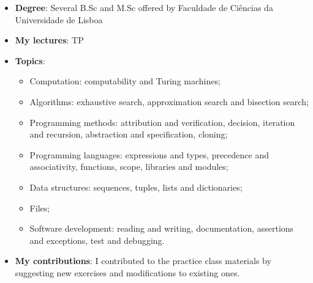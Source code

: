 \begin{itemize}
    \item \textbf{Degree}: Several B.Sc and M.Sc offered by Faculdade de Ciências da Universidade de Lisboa
    \item \textbf{My lectures}: TP
    \item \textbf{Topics}:
    \begin{itemize}
        \item Computation: computability and Turing machines;
        \item Algorithms: exhaustive search, approximation search and bisection search;
        \item Programming methods: attribution and verification, decision, iteration and recursion, abstraction and specification, cloning;
        \item Programming languages: expressions and types, precedence and associativity, functions, scope, libraries and modules;
        \item Data structures: sequences, tuples, lists and dictionaries;
        \item Files;
        \item Software development: reading and writing, documentation, assertions and exceptions, test and debugging.
    \end{itemize}
    \item \textbf{My contributions}: I contributed to the practice class materials by suggesting new exercises and modifications to existing ones.
\end{itemize}


